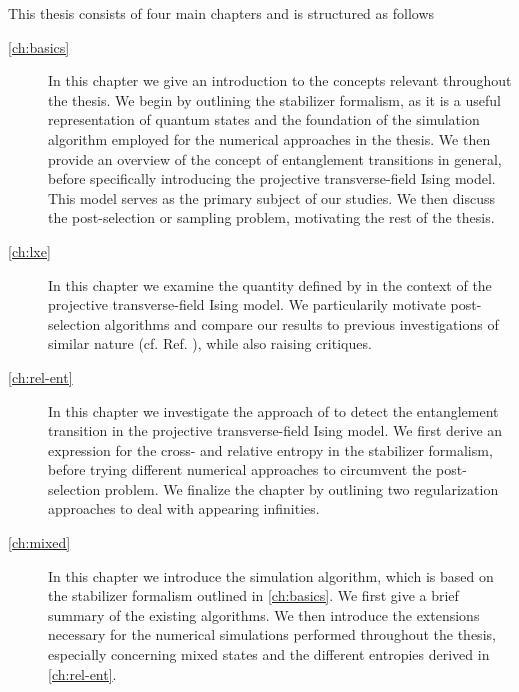 This thesis consists of four main chapters and is structured as follows
\begin{description}
  \item[\cref{ch:basics}] In this chapter we give an introduction to the
    concepts relevant throughout the thesis. We begin by outlining the
    stabilizer formalism, as it is a useful representation of quantum states
    and the foundation of the simulation algorithm employed for the numerical
    approaches in the thesis. We then provide an overview of the concept of entanglement
    transitions in general, before specifically introducing the projective
    transverse-field Ising model. This model serves as the primary subject of
    our studies. We then discuss the post-selection or sampling problem,
    motivating the rest of the thesis.
  \item[\cref{ch:lxe}] In this chapter we examine the quantity defined by
    \citeauthor{liCrossEntropyBenchmark2023} in the context of the projective
    transverse-field Ising model. We particularily motivate post-selection
    algorithms and compare our results to
    previous investigations of similar nature (cf. Ref.
    \cite{tikhanovskayaUniversalityCrossEntropy2023}), while also raising
    critiques.
  \item[\cref{ch:rel-ent}] In this chapter we investigate the approach of
    \citeauthor{garrattProbingPostmeasurementEntanglement2023} to detect the
    entanglement transition in the projective transverse-field Ising model. We
    first derive an expression for the cross- and relative entropy in the
    stabilizer formalism, before trying different numerical approaches to
    circumvent the post-selection problem. We finalize the chapter by outlining
    two regularization approaches to deal with appearing infinities.
  \item[\cref{ch:mixed}] In this chapter we introduce the simulation algorithm,
    which is based on the stabilizer formalism outlined in \cref{ch:basics}. We
    first give a brief summary of the existing algorithms. We then introduce
    the extensions necessary for the numerical simulations performed throughout
    the thesis, especially concerning mixed states and the different entropies
    derived in \cref{ch:rel-ent}.
\end{description}

\lipsum[0-1]
